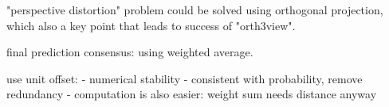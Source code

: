 "perspective distortion" problem could be solved using orthogonal projection, which also a key point that leads to success of "orth3view".

final prediction consensus: using weighted average.

use unit offset:
 - numerical stability
 - consistent with probability, remove redundancy
 - computation is also easier: weight sum needs distance anyway